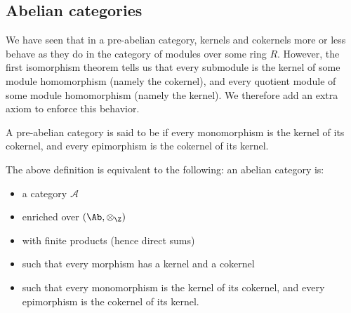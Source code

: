 \documentclass[main.tex]{subfiles}
\begin{document}
\subsection{Abelian categories}
\label{ssc:abelian_categories}

We have seen that in a pre-abelian category, kernels and cokernels more or less behave as they do in the category of modules over some ring $R$. However, the first isomorphism theorem tells us that every submodule is the kernel of some module homomorphism (namely the cokernel), and every quotient module of some module homomorphism (namely the kernel). We therefore add an extra axiom to enforce this behavior.

\begin{definition}
  \label{def:abelian_cateogry}
  A pre-abelian category is said to be  if every monomorphism is the kernel of its cokernel, and every epimorphism is the cokernel of its kernel.
\end{definition}

The above definition is equivalent to the following: an abelian category is:
\begin{itemize}
  \item a category \(\mathcal{A}\)

  \item enriched over \((\Ab, \otimes_{\Z})\)

  \item with finite products (hence direct sums)

  \item such that every morphism has a kernel and a cokernel

  \item such that every monomorphism is the kernel of its cokernel, and every epimorphism is the cokernel of its kernel.
\end{itemize}
\end{document}
